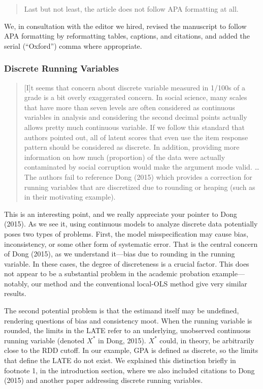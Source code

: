\documentclass[12pt]{article}
\begin{document}
\begin{quote}
Last but not least, the article does not follow APA formatting at
all.
\end{quote}
We, in consultation with the editor we hired, revised the manuscript
to follow APA formatting by reformatting tables, captions, and
citations, and added the serial (``Oxford'') comma where appropriate.

\subsubsection{Discrete Running Variables}
\begin{quote}
[I]t seems that concern about discrete variable measured in 1/100s of a
grade is a bit overly exaggerated concern. In social science, many
scales that have more than seven levels are often considered as
continuous variables in analysis and considering the second decimal
points actually allows pretty much continuous variable. If we follow
this standard that authors pointed out, all of latent scores that even
use the item response pattern should be considered as discrete. In
addition, providing more information on how much (proportion) of the
data were actually contaminated by social corruption would make the
argument mode valid. \dots The authors fail to reference Dong (2015) which provides a correction
for running variables that are discretized due to rounding or heaping
(such as in their motivating example).
\end{quote}

This is an interesting point, and we really appreciate your pointer to
Dong (2015). As we see it, using continuous models to analyze discrete
data potentially poses two types of problems. First, the model
misspecification may cause bias, inconsistency, or some other form of
systematic error. That is the central concern of Dong (2015), as we
understand it---bias due to rounding in the running variable. In these
cases, the degree of discreteness is a crucial factor. This does not
appear to be a substantial problem in the academic probation
example---notably, our method and the conventional local-OLS method
give very similar results.

The second potential problem is that the estimand itself may be
undefined, rendering questions of bias and consistency moot. When the running variable is
rounded, the limits in the LATE refer to an underlying, unobserved
continuous running variable (denoted $X^*$ in Dong, 2015). $X^*$
could, in theory, be arbitrarily close to the RDD cutoff. In our
example, GPA is defined as discrete, so the limits that define the
LATE do not exist. We explained this distinction briefly in footnote
1, in the introduction section, where we also included citations to
Dong (2015) and another paper addressing discrete running variables.
\end{document}

